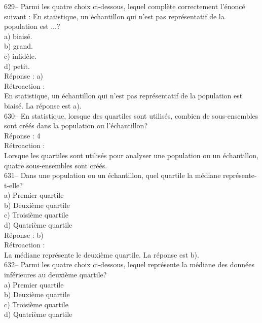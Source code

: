 ﻿\documentclass[letterpaper, 12pt]{article}
\begin{document}
629-- Parmi les quatre choix ci-dessous, lequel compl\`ete
correctement l'\'enonc\'e suivant : \og En statistique, un
\'echantillon qui n'est pas repr\'esentatif de la population est $\ldots$\fg ?\\
a) biais\'e.\\
b) grand.\\
c) infid\`ele.\\
d) petit.\\

R\'eponse : a)\\

R\'etroaction : \\
En statistique, un \'echantillon qui n'est pas repr\'esentatif de la
population est biais\'e.  La r\'eponse est a).\\

630-- En statistique, lorsque des quartiles sont utilis\'es, combien de
sous-ensembles sont cr\'e\'es dans la population ou l'\'echantillon?\\

R\'eponse : 4\\

R\'etroaction : \\
Lorsque les quartiles sont utilis\'es pour analyser une population ou un
\'echantillon, quatre sous-ensembles sont cr\'e\'es.\\

631-- Dans une population ou un \'echantillon, quel quartile la m\'ediane
repr\'esente-t-elle?\\
a) Premier quartile\\
b) Deuxi\`eme quartile\\
c) Troisi\`eme quartile\\
d) Quatri\`eme quartile\\

R\'eponse : b)\\

R\'etroaction : \\
La m\'ediane repr\'esente le deuxi\`eme quartile.  La r\'eponse est b).\\

632-- Parmi les quatre choix ci-dessous, lequel repr\'esente la m\'ediane
des donn\'ees inf\'erieures au deuxi\`eme quartile?\\
a) Premier quartile\\
b) Deuxi\`eme quartile\\
c) Troisi\`eme quartile\\
d) Quatri\`eme quartile\\
\end{document}
